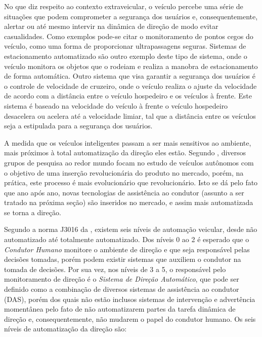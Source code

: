 No que diz respeito ao contexto extraveicular, o veículo percebe uma série de situações que podem comprometer a segurança dos usuários e, consequentemente, alertar ou até mesmo intervir na dinâmica de direção de modo evitar casualidades. Como exemplos pode-se citar o monitoramento de pontos cegos do veículo, como uma forma de proporcionar ultrapassagens seguras. Sistemas de estacionamento automatizado são outro exemplo deste tipo de sistema, onde o veículo monitora os objetos que o rodeiam e realiza a manobra de estacionamento de forma automática. Outro sistema que visa garantir a segurança dos usuários é o controle de velocidade de cruzeiro, onde o veículo realiza o ajuste da velocidade de acordo com a distância entre o veículo hospedeiro e os veículos à frente. Este sistema é baseado na velocidade do veículo à frente o veículo hospedeiro desacelera ou acelera até a velocidade limiar, tal que a distância entre os veículos seja a estipulada para a segurança dos usuários.

A medida que os veículos inteligentes passam a ser mais sensitivos ao ambiente, mais próximos à total automatização da direção eles estão. Segundo , diversos grupos de pesquisa ao redor mundo focam no estudo de veículos autônomos com o objetivo de uma inserção revolucionária do produto no mercado, porém, na prática, este processo é mais evolucionário que revolucionário. Isto se dá pelo fato que ano após ano, novas tecnologias de assistência ao condutor (assunto a ser tratado na próxima seção) são inseridos no mercado, e assim mais automatizada se torna a direção. 


Segundo a norma J3016 da , existem seis níveis de automação veicular, desde não automatizado até totalmente automatizado. Dos níveis 0 ao 2 é esperado que o \textit{Condutor Humano} monitore o ambiente de direção e que seja responsável pelas decisões tomadas, porém podem existir sistemas que auxiliem o condutor na tomada de decisões. Por sua vez, nos níveis de 3 a 5, o responsável pelo monitoramento de direção é o \textit{Sistema de Direção Automático}, que pode ser definido como a combinação de diversos sistemas de assistência ao condutor (DAS), porém dos quais não estão inclusos sistemas de intervenção e advertência momentânea pelo fato de não automatizarem partes da tarefa dinâmica de direção e, consequentemente, não mudarem o papel do condutor humano. Os seis níveis de automatização da direção são:

